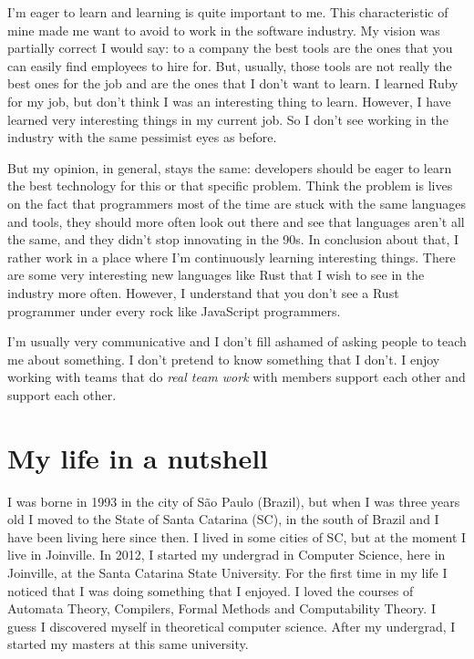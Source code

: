 \documentclass[11pt,a4paper,sans]{moderncv}
\begin{document}
\medskip

I'm eager to learn and learning is quite important to me.
This characteristic of mine made me want to avoid to work in the software industry.
My vision was partially correct I would say:
to a company the best tools are the ones that you can easily find employees to hire for.
But, usually, those tools are not really the best ones for the job and are the ones that I don't want to learn.
I learned Ruby for my job, but don't think I was an interesting thing to learn.
However, I have learned very interesting things in my current job.
So I don't see working in the industry with the same pessimist eyes as before.

\medskip

But my opinion, in general, stays the same: developers should be eager to learn the best technology for this or that specific problem.
Think the problem is lives on the fact that programmers most of the time are stuck with the same languages and tools, they should more often look out there and see that languages aren't all the same, and they didn't stop innovating in the 90s.
In conclusion about that, I rather work in a place where I'm continuously learning interesting things.
There are some very interesting new languages like Rust that I wish to see in the industry more often.
However, I understand that you don't see a Rust programmer under every rock like JavaScript programmers.

\medskip

I'm usually very communicative and I don't fill ashamed of asking people to teach me about something.
I don't pretend to know something that I don't.
I enjoy working with teams that do \textit{real team work} with members support each other and support each other.

\section{My life in a nutshell}
I was borne in 1993 in the city of São Paulo (Brazil), but when I was three years old I moved to the State of Santa Catarina (SC), in the south of Brazil and I have been living here since then.
I lived in some cities of SC, but at the moment I live in Joinville.
In 2012, I started my undergrad in Computer Science, here in Joinville, at the Santa Catarina State University.
For the first time in my life I noticed that I was doing something that I enjoyed.
I loved the courses of Automata Theory, Compilers, Formal Methods and Computability Theory.
I guess I discovered myself in theoretical computer science.
After my undergrad, I started my masters at this same university.
\end{document}
